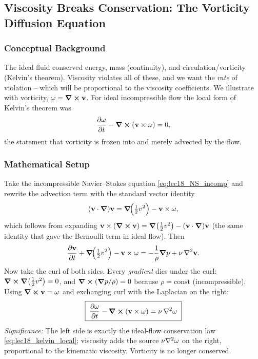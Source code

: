 \documentclass[../main.tex]{subfiles}
\begin{document}
\subsection{Viscosity Breaks Conservation: The Vorticity Diffusion Equation}\label{sec:lec18:vorticity}

\subsubsection*{Conceptual Background}
The ideal fluid conserved energy, mass (continuity), and circulation/vorticity (Kelvin's theorem). Viscosity violates all of these, and we want the \emph{rate} of violation -- which will be proportional to the viscosity coefficients. We illustrate with vorticity, $\mathbf{\omega}=\curl\mathbf{v}$. For ideal incompressible flow the local form of Kelvin's theorem was
\begin{equation}
  \pdv{\mathbf{\omega}}{t} - \curl(\mathbf{v}\times\mathbf{\omega}) = 0,
  \label{eq:lec18_kelvin_local}
\end{equation}
the statement that vorticity is frozen into and merely advected by the flow.

\subsubsection*{Mathematical Setup}
Take the incompressible Navier--Stokes equation \eqref{eq:lec18_NS_incomp} and rewrite the advection term with the standard vector identity
\begin{equation}
  (\mathbf{v}\cdot\grad)\mathbf{v} = \grad\!\Big(\tfrac{1}{2}v^2\Big) - \mathbf{v}\times\mathbf{\omega},
  \label{eq:lec18_advection_identity}
\end{equation}
which follows from expanding $\mathbf{v}\times(\curl\mathbf{v})=\grad(\tfrac12 v^2)-(\mathbf{v}\cdot\grad)\mathbf{v}$ (the same identity that gave the Bernoulli term in ideal flow). Then
\begin{equation}
  \pdv{\mathbf{v}}{t} + \grad\!\Big(\tfrac{1}{2}v^2\Big) - \mathbf{v}\times\mathbf{\omega} = -\frac{1}{\rho}\grad p + \nu\,\nabla^2\mathbf{v} .
  \label{eq:lec18_NS_rotform}
\end{equation}
Now take the curl of both sides. Every \emph{gradient} dies under the curl: $\curl\grad(\tfrac12 v^2)=0$, and $\curl(\grad p/\rho)=0$ because $\rho=\text{const}$ (incompressible). Using $\curl\mathbf{v}=\mathbf{\omega}$ and exchanging curl with the Laplacian on the right:
\begin{equation}
  \boxed{\;\pdv{\mathbf{\omega}}{t} - \curl(\mathbf{v}\times\mathbf{\omega}) = \nu\,\nabla^2\mathbf{\omega}\;}
  \label{eq:lec18_vorticity_diffusion}
\end{equation}
\textit{Significance:} The left side is exactly the ideal-flow conservation law \eqref{eq:lec18_kelvin_local}; viscosity adds the source $\nu\nabla^2\mathbf{\omega}$ on the right, proportional to the kinematic viscosity. Vorticity is no longer conserved.
\end{document}
